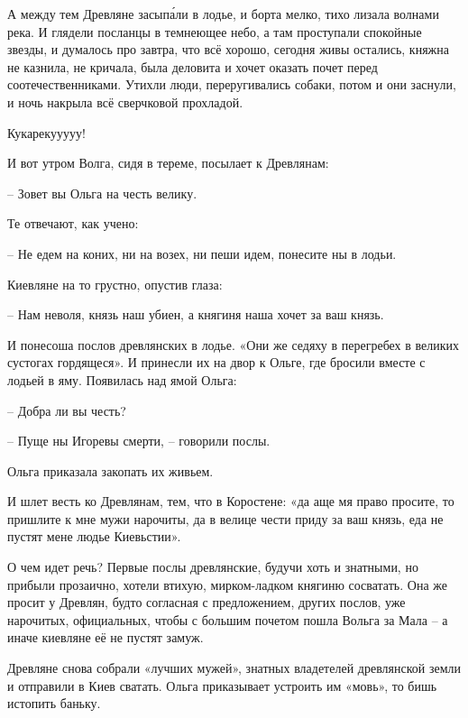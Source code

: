 А между тем Древляне засып\'али в лодье, и борта мелко, тихо лизала волнами река. И глядели посланцы в темнеющее небо, а там проступали спокойные звезды, и думалось про завтра, что всё хорошо, сегодня живы остались, княжна не казнила, не кричала, была деловита и хочет оказать почет перед соотечественниками. Утихли люди, переругивались собаки, потом и они заснули, и ночь накрыла всё сверчковой прохладой.

Кукарекууууу!

И вот утром Волга, сидя в тереме, посылает к Древлянам:

   – Зовет вы Ольга на честь велику.

Те отвечают, как учено:

   – Не едем на коних, ни на возех, ни пеши идем, понесите ны в лодьи.

Киевляне на то грустно, опустив глаза:

   – Нам неволя, князь наш убиен, а княгиня наша хочет за ваш князь.

И понесоша послов древлянских в лодье. «Они же седяху в перегребех в великих сустогах гордящеся». И принесли их на двор к Ольге, где бросили вместе с лодьей в яму. Появилась над ямой Ольга:

   – Добра ли вы честь?

   – Пуще ны Игоревы смерти, – говорили послы.

Ольга приказала закопать их живьем. 



И шлет весть ко Древлянам, тем, что в Коростене: «да аще мя право просите, то пришлите к мне мужи нарочиты, да в велице чести приду за ваш князь, еда не пустят мене людье Киевьстии».

О чем идет речь? Первые послы древлянские, будучи хоть и знатными, но прибыли прозаично, хотели втихую, мирком-ладком княгиню сосватать. Она же просит у Древлян, будто согласная с предложением, других послов, уже нарочитых, официальных, чтобы с большим почетом пошла Вольга за Мала – а иначе киевляне её не пустят замуж.

Древляне снова собрали «лучших мужей», знатных владетелей древлянской земли и отправили в Киев сватать. Ольга приказывает устроить им «мовь», то бишь истопить баньку.

